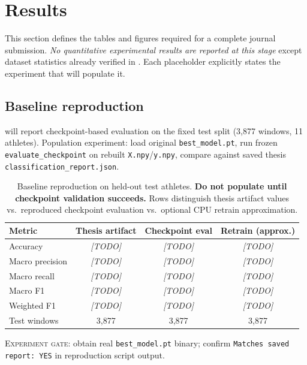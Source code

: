 \section{Results}
\label{sec:results}

This section defines the tables and figures required for a complete journal submission.
\emph{No quantitative experimental results are reported at this stage} except dataset statistics already verified in .
Each placeholder explicitly states the experiment that will populate it.

\subsection{Baseline reproduction}
\label{sec:results:baseline}

 will report checkpoint-based evaluation on the fixed test split (3{,}877 windows, 11 athletes).
Population experiment: load original \texttt{best\_model.pt}, run frozen \texttt{evaluate\_checkpoint} on rebuilt \texttt{X.npy}/\texttt{y.npy}, compare against saved thesis \texttt{classification\_report.json}.

\begin{table}[t]
  \centering
  \caption{Baseline reproduction on held-out test athletes. \textbf{Do not populate until checkpoint validation succeeds.} Rows distinguish thesis artifact values vs.\ reproduced checkpoint evaluation vs.\ optional CPU retrain approximation.}
  \label{tab:baseline_reproduction}
  \begin{tabular}{lccc}
    \toprule
    Metric & Thesis artifact & Checkpoint eval & Retrain (approx.) \\
    \midrule
    Accuracy & \textit{[TODO]} & \textit{[TODO]} & \textit{[TODO]} \\
    Macro precision & \textit{[TODO]} & \textit{[TODO]} & \textit{[TODO]} \\
    Macro recall & \textit{[TODO]} & \textit{[TODO]} & \textit{[TODO]} \\
    Macro F1 & \textit{[TODO]} & \textit{[TODO]} & \textit{[TODO]} \\
    Weighted F1 & \textit{[TODO]} & \textit{[TODO]} & \textit{[TODO]} \\
    Test windows & 3{,}877 & 3{,}877 & 3{,}877 \\
    \bottomrule
  \end{tabular}
\end{table}

\textsc{Experiment gate:} obtain real \texttt{best\_model.pt} binary; confirm \texttt{Matches saved report: YES} in reproduction script output.

